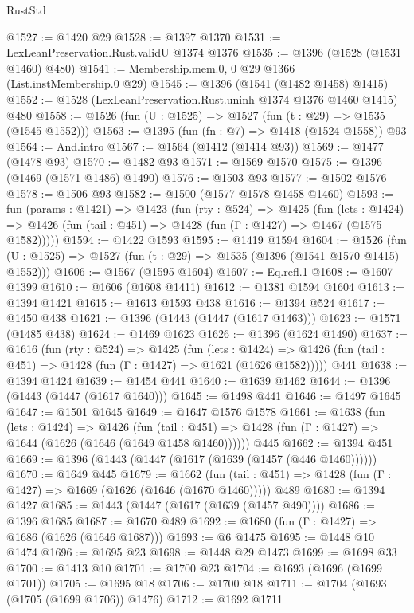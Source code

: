 \begin{lexlean}{RustStd}
\begin{coremodule}
@1527 := @1420 @29
@1528 := @1397 @1370
@1531 := LexLeanPreservation.Rust.validU @1374 @1376
@1535 := @1396 (@1528 (@1531 @1460) @480)
@1541 := Membership.mem.{0, 0} @29 @1366 (List.instMembership.{0} @29)
@1545 := @1396 (@1541 (@1482 @1458) @1415)
@1552 := @1528 (LexLeanPreservation.Rust.uninh @1374 @1376 @1460 @1415) @480
@1558 := @1526 (fun (U : @1525) => @1527 (fun (t : @29) => @1535 (@1545 @1552)))
@1563 := @1395 (fun (fn : @7) => @1418 (@1524 @1558)) @93
@1564 := And.intro
@1567 := @1564 (@1412 (@1414 @93))
@1569 := @1477 (@1478 @93)
@1570 := @1482 @93
@1571 := @1569 @1570
@1575 := @1396 (@1469 (@1571 @1486) @1490)
@1576 := @1503 @93
@1577 := @1502 @1576
@1578 := @1506 @93
@1582 := @1500 (@1577 @1578 @1458 @1460)
@1593 := fun (params : @1421) =>
  @1423
    (fun (rty : @524) =>
    @1425
      (fun (lets : @1424) =>
      @1426 (fun (tail : @451) => @1428 (fun (Γ : @1427) => @1467 (@1575 @1582)))))
@1594 := @1422 @1593
@1595 := @1419 @1594
@1604 := @1526 (fun (U : @1525) => @1527 (fun (t : @29) => @1535 (@1396 (@1541 @1570 @1415) @1552)))
@1606 := @1567 (@1595 @1604)
@1607 := Eq.refl.{1}
@1608 := @1607 @1399
@1610 := @1606 (@1608 @1411)
@1612 := @1381 @1594 @1604
@1613 := @1394 @1421
@1615 := @1613 @1593 @438
@1616 := @1394 @524
@1617 := @1450 @438
@1621 := @1396 (@1443 (@1447 (@1617 @1463)))
@1623 := @1571 (@1485 @438)
@1624 := @1469 @1623
@1626 := @1396 (@1624 @1490)
@1637 := @1616
    (fun (rty : @524) =>
    @1425
      (fun (lets : @1424) =>
      @1426 (fun (tail : @451) => @1428 (fun (Γ : @1427) => @1621 (@1626 @1582)))))
    @441
@1638 := @1394 @1424
@1639 := @1454 @441
@1640 := @1639 @1462
@1644 := @1396 (@1443 (@1447 (@1617 @1640)))
@1645 := @1498 @441
@1646 := @1497 @1645
@1647 := @1501 @1645
@1649 := @1647 @1576 @1578
@1661 := @1638
    (fun (lets : @1424) =>
    @1426
      (fun (tail : @451) => @1428 (fun (Γ : @1427) => @1644 (@1626 (@1646 (@1649 @1458 @1460))))))
    @445
@1662 := @1394 @451
@1669 := @1396 (@1443 (@1447 (@1617 (@1639 (@1457 (@446 @1460))))))
@1670 := @1649 @445
@1679 := @1662
    (fun (tail : @451) => @1428 (fun (Γ : @1427) => @1669 (@1626 (@1646 (@1670 @1460)))))
    @489
@1680 := @1394 @1427
@1685 := @1443 (@1447 (@1617 (@1639 (@1457 @490))))
@1686 := @1396 @1685
@1687 := @1670 @489
@1692 := @1680 (fun (Γ : @1427) => @1686 (@1626 (@1646 @1687)))
@1693 := @6 @1475
@1695 := @1448 @10 @1474
@1696 := @1695 @23
@1698 := @1448 @29 @1473
@1699 := @1698 @33
@1700 := @1413 @10
@1701 := @1700 @23
@1704 := @1693 (@1696 (@1699 @1701))
@1705 := @1695 @18
@1706 := @1700 @18
@1711 := @1704 (@1693 (@1705 (@1699 @1706)) @1476)
@1712 := @1692 @1711

\end{coremodule}
\end{lexlean}
